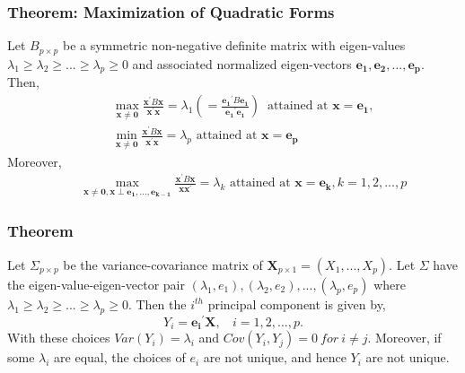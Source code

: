 \documentclass[10pt]{beamer} %
\begin{document}
\begin{frame}
   \frametitle{Theorem: Maximization of Quadratic Forms}
   Let $B_{p \times p}$ be a symmetric non-negative definite matrix with
   eigen-values $\lambda_1 \geq \lambda_2 \geq ... \geq \lambda_p \geq 0$ and
   associated normalized eigen-vectors $\boldsymbol{e_1},
   \boldsymbol{e_2},...,\boldsymbol{e_p}$. Then,
   \begin{eqnarray}
      &&	\operatorname*{max}_{\boldsymbol{x} \neq \boldsymbol{0}}
      \frac{\boldsymbol{x}^{'}B\boldsymbol{x}}{\boldsymbol{x}^{'}\boldsymbol{x}}
      = \lambda_1 \left(=
      \frac{\boldsymbol{e_1}^{'}B\boldsymbol{e_1}}{\boldsymbol{e_1}^{'}\boldsymbol{e_1}}
      \right)\ \text{ attained at } \boldsymbol{x}=\boldsymbol{e_1}, \nonumber \\
      && \operatorname*{min}_{\boldsymbol{x} \neq \boldsymbol{0}}
      \frac{\boldsymbol{x}^{'}B\boldsymbol{x}}{\boldsymbol{x}^{'}\boldsymbol{x}} =
      \lambda_p \text{ attained at } \boldsymbol{x}=\boldsymbol{e_p} \nonumber
   \end{eqnarray}	
   Moreover,
   \begin{eqnarray}
      &&	\operatorname*{max}_{\boldsymbol{x} \neq \boldsymbol{0}, \boldsymbol{x}
      \perp \boldsymbol{e_1},...,\boldsymbol{e_{k-1}}}
      \frac{\boldsymbol{x}^{'}B\boldsymbol{x}}{\boldsymbol{x}\boldsymbol{x}^{'}}
      = \lambda_k \text{ attained at } \boldsymbol{x}=\boldsymbol{e_k}, k=1,2,...,p
      \nonumber
   \end{eqnarray}
\end{frame}

\begin{frame}
   \frametitle{Theorem }
   Let $\Sigma_{p \times p}$ be the variance-covariance matrix of
   $\boldsymbol{X}_{p \times 1} = (X_1,...,X_p)$. Let $\Sigma$ have the
   eigen-value-eigen-vector pair
   $(\lambda_1,e_1),(\lambda_2,e_2),...,(\lambda_p,e_p)$ where $\lambda_1 \geq
   \lambda_2 \geq ... \geq \lambda_p \geq 0$. Then the $i^{th}$ principal
   component is given by,
   \begin{equation*}
      Y_i=\boldsymbol{e_i}^{'}\boldsymbol{X},\ \ \ \ i=1,2,...,p.
   \end{equation*}
   With these choices $Var(Y_i)=\lambda_i$ and $Cov(Y_i,Y_j)=0\ for\ i \neq j.$
   Moreover, if some $\lambda_i$ are equal, the choices of $e_i$ are not unique,
   and hence $Y_i$ are not unique.
\end{frame}
\end{document}
